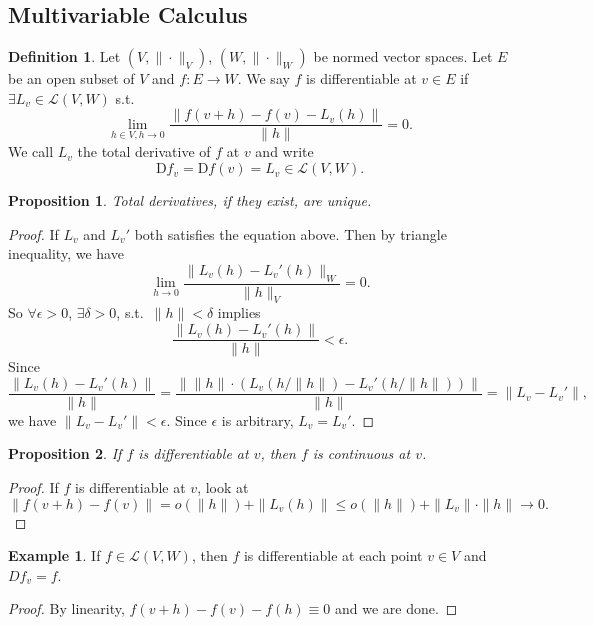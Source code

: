 \documentclass[12pt]{article}
\theoremstyle{plain}
\newtheorem*{prop}{Proposition}
\theoremstyle{definition}
\newtheorem*{defn}{Definition}
\newtheorem*{eg}{Example}
\begin{document}
\subsection*{Multivariable Calculus}
\begin{defn}
    Let $(V, \|\cdot\|_V)$, $(W, \|\cdot\|_W)$ be normed vector spaces.
    Let $E$ be an open subset of $V$ and $f:E\rightarrow W$.
    We say $f$ is differentiable at $v\in E$ if $\exists L_v\in \mathcal{L}(V,W)$ s.t.
    \[
        \lim_{h\in V, h\rightarrow 0} \frac{\|f(v+h)-f(v)-L_v(h)\|}{\|h\|} = 0.
    \]
    We call $L_v$ the total derivative of $f$ at $v$ and write
    \[
        \mathrm{D}f_v = \mathrm{D}f(v) = L_v \in \mathcal{L}(V,W).
    \]
\end{defn}

\begin{prop}
    Total derivatives, if they exist, are unique.
\end{prop}
\begin{proof}
    If $L_v$ and $L_v'$ both satisfies the equation above.
    Then by triangle inequality, we have
    \[
        \lim_{h\rightarrow 0}\frac{\|L_v(h)-L_v'(h)\|_W}{\|h\|_V} = 0.
    \]
    So $\forall \epsilon>0$, $\exists \delta>0$, s.t.\ $\|h\|<\delta$ implies
    \[
        \frac{\|L_v(h)-L_v'(h)\|}{\|h\|}<\epsilon.
    \]
    Since
    \[
        \frac{\|L_v(h)-L_v'(h)\|}{\|h\|}
        = \frac{\|\|h\|\cdot( L_v(h/\|h\|) - L_v'(h/\|h\|))\|}{\|h\|}
        =\|L_v-L_v'\|,
    \]
    we have $\|L_v-L_v'\|<\epsilon$.
    Since $\epsilon$ is arbitrary, $L_v=L_v'$.
\end{proof}

\begin{prop}
    If $f$ is differentiable at $v$, then $f$ is continuous at $v$.
\end{prop}
\begin{proof}
    If $f$ is differentiable at $v$, look at
    \[
        \|f(v+h)-f(v)\|
        =o(\|h\|)+\|L_v(h)\|
        \leq o(\|h\|)+\|L_v\|\cdot\|h\|
        \rightarrow 0.
    \]
\end{proof}

\begin{eg}
    If $f\in \mathcal{L}(V,W)$, then $f$ is differentiable at each point $v\in V$ and $Df_v=f$.
\end{eg}
\begin{proof}
    By linearity, $f(v+h) - f(v) - f(h) \equiv 0$ and we are done.
\end{proof}
\end{document}
